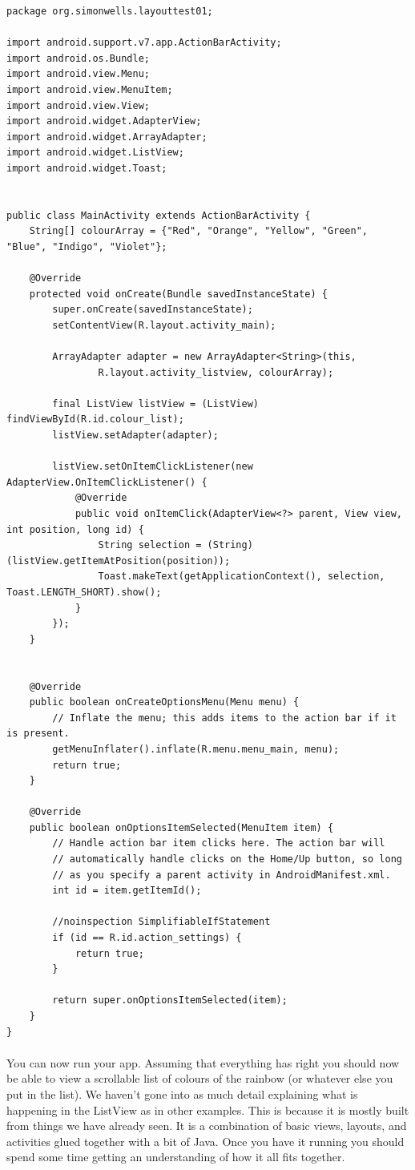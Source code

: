 \documentclass[12pt, a4paper, twoside]{book}
\begin{document}
\begin{lstlisting}
package org.simonwells.layouttest01;

import android.support.v7.app.ActionBarActivity;
import android.os.Bundle;
import android.view.Menu;
import android.view.MenuItem;
import android.view.View;
import android.widget.AdapterView;
import android.widget.ArrayAdapter;
import android.widget.ListView;
import android.widget.Toast;


public class MainActivity extends ActionBarActivity {
    String[] colourArray = {"Red", "Orange", "Yellow", "Green", "Blue", "Indigo", "Violet"};

    @Override
    protected void onCreate(Bundle savedInstanceState) {
        super.onCreate(savedInstanceState);
        setContentView(R.layout.activity_main);

        ArrayAdapter adapter = new ArrayAdapter<String>(this,
                R.layout.activity_listview, colourArray);

        final ListView listView = (ListView) findViewById(R.id.colour_list);
        listView.setAdapter(adapter);

        listView.setOnItemClickListener(new AdapterView.OnItemClickListener() {
            @Override
            public void onItemClick(AdapterView<?> parent, View view, int position, long id) {
                String selection = (String) (listView.getItemAtPosition(position));
                Toast.makeText(getApplicationContext(), selection, Toast.LENGTH_SHORT).show();
            }
        });
    }


    @Override
    public boolean onCreateOptionsMenu(Menu menu) {
        // Inflate the menu; this adds items to the action bar if it is present.
        getMenuInflater().inflate(R.menu.menu_main, menu);
        return true;
    }

    @Override
    public boolean onOptionsItemSelected(MenuItem item) {
        // Handle action bar item clicks here. The action bar will
        // automatically handle clicks on the Home/Up button, so long
        // as you specify a parent activity in AndroidManifest.xml.
        int id = item.getItemId();

        //noinspection SimplifiableIfStatement
        if (id == R.id.action_settings) {
            return true;
        }

        return super.onOptionsItemSelected(item);
    }
}
\end{lstlisting}

\paragraph{} You can now run your app. Assuming that everything has right you should now be able to view a scrollable list of colours of the rainbow (or whatever else you put in the list). We haven't gone into as much detail explaining what is happening in the ListView as in other examples. This is because it is mostly built from things we have already seen. It is a combination of basic views, layouts, and activities glued together with a bit of Java. Once you have it running you should spend some time getting an understanding of how it all fits together.
\end{document}
